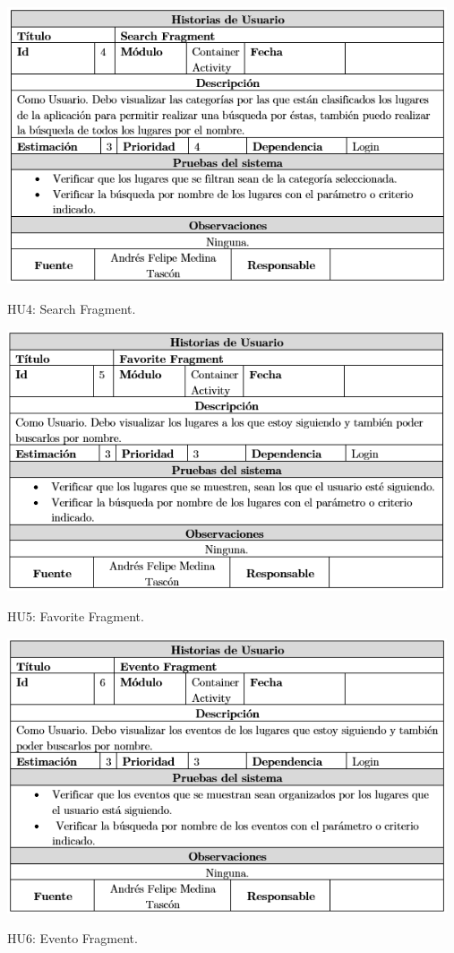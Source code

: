 \documentclass[12pt,letterpaper,openany]{book}
\begin{document}
\begin{table}[H]
\centering
\includegraphics[width=13cm]{./imagenes/HU/HU4}
\caption{HU4: Search Fragment.}
\end{table}

\begin{table}[H]
\centering
\includegraphics[width=13cm]{./imagenes/HU/HU5}
\caption{HU5: Favorite Fragment.}
\end{table}

\begin{table}[H]
\centering
\includegraphics[width=13cm]{./imagenes/HU/HU6}
\caption{HU6: Evento Fragment.}
\end{table}
\end{document}
